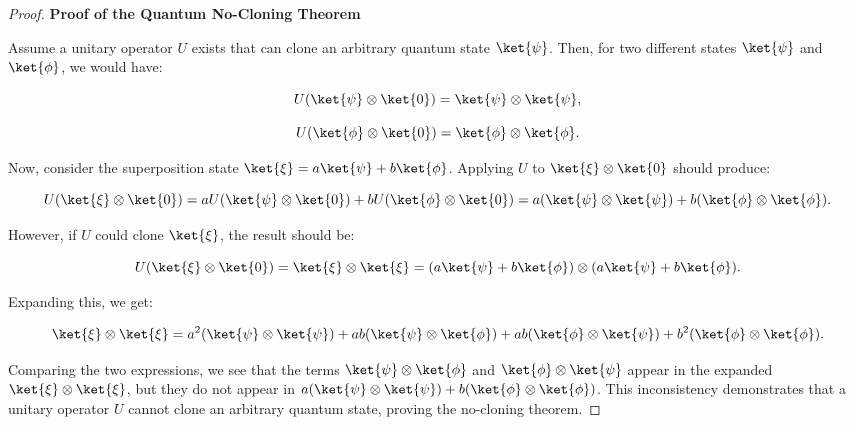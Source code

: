 \begin{proof}
  \textbf{Proof of the Quantum No-Cloning Theorem}

  Assume a unitary operator $U$ exists that can clone an arbitrary quantum
  state $\ket{\psi}$. Then, for two different states $\ket{\psi}$ and
  $\ket{\phi}$, we would have:

  \[
    U(\ket{\psi} \otimes \ket{0}) = \ket{\psi} \otimes \ket{\psi},
  \]

  \[
    U(\ket{\phi} \otimes \ket{0}) = \ket{\phi} \otimes \ket{\phi}.
  \]

  Now, consider the superposition state $\ket{\xi} = a\ket{\psi} +
  b\ket{\phi}$. Applying $U$ to $\ket{\xi} \otimes \ket{0}$ should produce:

  \[
    U(\ket{\xi} \otimes \ket{0}) = aU(\ket{\psi} \otimes \ket{0}) +
    bU(\ket{\phi} \otimes \ket{0}) = a(\ket{\psi} \otimes \ket{\psi}) +
    b(\ket{\phi} \otimes \ket{\phi}).
  \]

  However, if $U$ could clone $\ket{\xi}$, the result should be:

  \[
    U(\ket{\xi} \otimes \ket{0}) = \ket{\xi} \otimes \ket{\xi} = (a\ket{\psi}
    + b\ket{\phi}) \otimes (a\ket{\psi} + b\ket{\phi}).
  \]

  Expanding this, we get:

  \[
    \ket{\xi} \otimes \ket{\xi} = a^2(\ket{\psi} \otimes \ket{\psi}) +
    ab(\ket{\psi} \otimes \ket{\phi}) + ab(\ket{\phi} \otimes \ket{\psi}) +
    b^2(\ket{\phi} \otimes \ket{\phi}).
  \]

  Comparing the two expressions, we see that the terms $\ket{\psi} \otimes
  \ket{\phi}$ and $\ket{\phi} \otimes \ket{\psi}$ appear in the expanded
  $\ket{\xi} \otimes \ket{\xi}$, but they do not appear in $a(\ket{\psi}
  \otimes \ket{\psi}) + b(\ket{\phi} \otimes \ket{\phi})$. This inconsistency
  demonstrates that a unitary operator $U$ cannot clone an arbitrary quantum
  state, proving the no-cloning theorem.
\end{proof}


